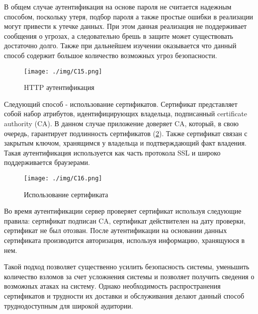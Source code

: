 В общем случае аутентификация на основе пароля не считается надежным способом, поскольку утеря, подбор пароля а также простые ошибки в реализации могут привести к утечке данных. При этом данная реализация не поддерживает сообщения о угрозах, а следовательно брешь в защите может существовать достаточно долго. Также при дальнейшем изучении оказывается что данный способ содержит большое количество возможных угроз безопасности.

\begin{figure}

\begin{center}

\texttt{[image: ./img/C15.png]}

\end{center}

\caption{HTTP аутентификация}

\label{pic:C15}

\end{figure}

Следующий способ - использование сертификатов. Сертификат представляет собой набор атрибутов, идентифицирующих владельца, подписанный certificate authority (CA). В данном случае приложение доверяет CA, который, в свою очередь, гарантирует подлинность сертификатов (\ref{pic:C16}). Также сертификат связан с закрытым ключом, хранящимся у владельца и подтверждающий факт владения. Такая аутентификация используется как часть протокола SSL и широко поддерживается браузерами.

\begin{figure}

\begin{center}

\texttt{[image: ./img/C16.png]}

\end{center}

\caption{Использование сертификата}

\label{pic:C16}

\end{figure}

Во время аутентификации сервер проверяет сертификат используя следующие правила: сертификат подписан CA, сертификат действителен на дату проверки, сертификат не был отозван. После аутентификации на основании данных сертификата производится авторизация, используя информацию, хранящуюся в нем.

Такой подход позволяет существенно усилить безопасность системы, уменьшить количество взломов за счет усложнения системы и позволяет получить сведения о возможных атаках на систему. Однако необходимость распространения сертификатов и трудности их доставки и обслуживания делают данный способ труднодоступным для широкой аудитории.

